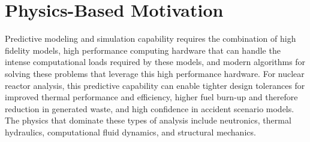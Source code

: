 \section{Physics-Based Motivation}
\label{sec:physics_motivation}
Predictive modeling and simulation capability requires the combination
of high fidelity models, high performance computing hardware that can
handle the intense computational loads required by these models, and
modern algorithms for solving these problems that leverage this high
performance hardware. For nuclear reactor analysis, this predictive
capability can enable tighter design tolerances for improved thermal
performance and efficiency, higher fuel burn-up and therefore reduction
in generated waste, and high confidence in accident scenario
models. The physics that dominate these types of analysis include
neutronics, thermal hydraulics, computational fluid dynamics, and
structural mechanics.


